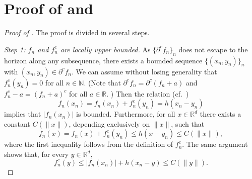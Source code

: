 \documentclass[11pt]{article}
\newcommand{\RR}{\mathbb{R}}
\newcommand{\R}{\RR}
\newcommand{\NN}{\mathbb{N}}
\theoremstyle{plain}
\theoremstyle{definition}\newtheorem{definition}[theorem]{Definition}
\theoremstyle{remark}
\begin{document}
\section{Proof of  and  }


\begin{proof}[Proof of ] The proof is divided in several steps. 

{\it Step 1: $f_n$ and $f_n^c$ are locally upper bounded.   } As $\{\partial^c f_n\}_n$ does not
escape to the horizon along any subsequence, there exists a bounded sequence  $\{(x_n,y_n)\}_n$ with $(x_n,y_n)\in \partial^c f_n$.  We can assume without losing generality that $f_n^c(y_n)=0$ for all $n\in \NN$. (Note that $\partial^c f_n = \partial^c (f_n+a) $ and $ f_n^c-a =  (f_n+a)^c $  for all $a\in \R$. ) Then the relation (cf.~\cite[Proposition~3.3.7]{RachevRueschendorf1998}) 
$$ f_n(x_n)= f_n(x_n) + f_n^c(y_n) = h(x_n-y_n) $$
implies that $|f_n(x_n)|$ is bounded. Furthermore, for all $x\in \R^d$ there exists a constant $C(\|x\|)$, depending exclusively on $\|x\|$,  such that 
$$ f_n(x)= f_n(x)+ f_n^c(y_n) \leq   h(x-y_n)  \leq C(\|x\|) , $$
where the first inequality follows from the definition of $f_n^c$. 
The same argument shows that, for every $y\in \R^d$,  
\begin{equation}
    \label{eq:proof-lemma-tech-upper-bound-conjugate}
     f_n^c(y)\leq  |f_n(x_n) |+   h(x_n-y)  \leq C(\|y\|) .
\end{equation}
%
%
%
%


\end{proof}
\end{document}
